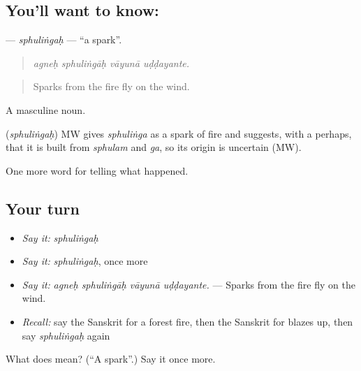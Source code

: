 \subsection*{You'll want to know: }
\textbf{} — \emph{sphuliṅgaḥ} — \textquotedblleft{}a spark\textquotedblright{}.

\begin{quote}
   
\end{quote}

\begin{quote}
\emph{agneḥ sphuliṅgāḥ vāyunā uḍḍayante.}
\end{quote}

\begin{quote}
Sparks from the fire fly on the wind.
\end{quote}

A masculine noun.

\begin{cousinweb}
\textbf{} (\emph{sphuliṅgaḥ}) MW gives \emph{sphuliṅga} as a spark of fire and suggests, with a perhaps, that it is built from \emph{sphulam} and \emph{ga}, so its origin is uncertain (MW).
\end{cousinweb}

\begin{grammarlens}[title={What you've built}]
One more word for telling what happened.
\end{grammarlens}

\subsection*{Your turn}
\begin{itemize}
\raggedright
  \item \emph{Say it:} \emph{sphuliṅgaḥ}
  \item \emph{Say it:} \emph{sphuliṅgaḥ}, once more
  \item \emph{Say it:} \emph{agneḥ sphuliṅgāḥ vāyunā uḍḍayante.} — Sparks from the fire fly on the wind.
  \item \emph{Recall:} say the Sanskrit for a forest fire, then the Sanskrit for blazes up, then say \emph{sphuliṅgaḥ} again
\end{itemize}

\begin{tcolorbox}[breakable,colback=teal!4,colframe=teal!35!black,title={Before you move on}]
What does  mean? (\textquotedblleft{}A spark\textquotedblright{}.) Say it once more.
\end{tcolorbox}

